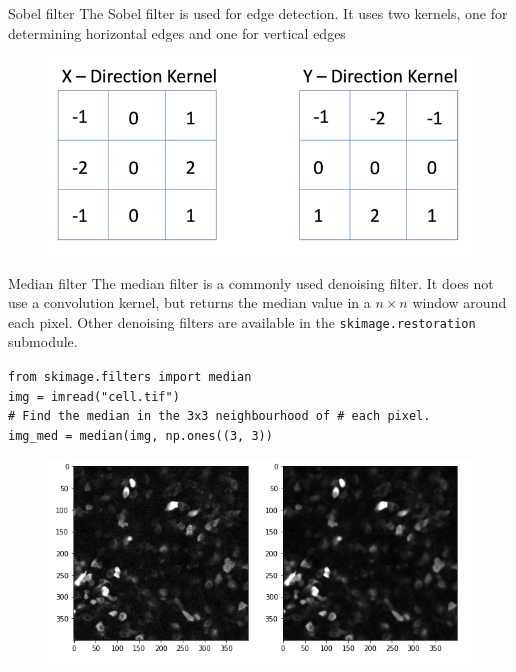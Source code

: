\documentclass[9pt, aspectratio=169]{beamer}
\begin{document}
\begin{frame}
	{Sobel filter}
	The Sobel filter is used for edge detection. It uses two kernels, one for determining horizontal edges and one for vertical edges
	\only<1>
	{
		\begin{figure}
			\centering
			\includegraphics[width=.5\textwidth]{sobel_kernels.png}
		\end{figure}
	}

\end{frame}

\begin{frame}
	{Median filter}
	The median filter is a commonly used denoising filter. It does not use a convolution kernel, but returns the median value in a $n\times n$ window around each pixel.
	Other denoising filters are available in the \texttt{skimage.restoration} submodule.
	\pause
	\begin{codebox}
		\texttt{from skimage.filters import median\\
			img = imread("cell.tif")\\
			\# Find the median in the 3x3 neighbourhood of
			\# each pixel.\\
			img\_med = median(img, np.ones((3, 3))
		}
	\end{codebox}
	\begin{figure}
		\centering
		\includegraphics[width=.6\textwidth]{cellsmedian.png}
	\end{figure}
\end{frame}
\end{document}
